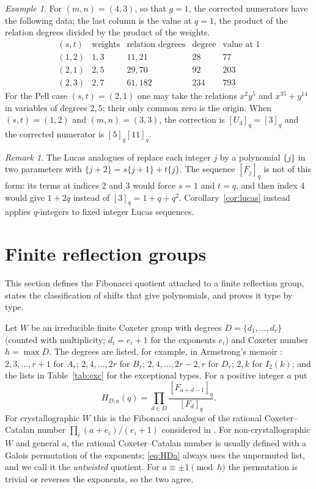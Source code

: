 \documentclass[11pt,a4paper]{article}
\theoremstyle{definition}\newtheorem{definition}[theorem]{Definition}
\theoremstyle{remark}\newtheorem{remark}[theorem]{Remark}\newtheorem{example}[theorem]{Example}
\numberwithin{equation}{section}
\begin{document}
\begin{example}
For $(m,n)=(4,3)$, so that $g=1$, the corrected numerators have the following data; the last column is the value at $q=1$, the product of the relation degrees divided by the product of the weights.
\[
\begin{array}{c|c|c|c|r}
(s,t)&\text{weights}&\text{relation degrees}&\text{degree}&\text{value at }1\\\hline
(1,2)&1,3&11,21&28&77\\
(2,1)&2,5&29,70&92&203\\
(2,3)&2,7&61,182&234&793
\end{array}
\]
For the Pell case $(s,t)=(2,1)$ one may take the relations $x^2y^5$ and $x^{35}+y^{14}$ in variables of degrees $2,5$; their only common zero is the origin. When $(s,t)=(1,2)$ and $(m,n)=(3,3)$, the correction is $[U_3]_q=[3]_q$ and the corrected numerator is $[5]_q[11]_q$.
\end{example}

\begin{remark}\label{rem:lucas-poly}
The Lucas analogues of \cite{bcms,st} replace each integer $j$ by a polynomial $\{j\}$ in two parameters with $\{j+2\}=s\{j+1\}+t\{j\}$. The sequence $[F_j]_q$ is not of this form: its terms at indices $2$ and $3$ would force $s=1$ and $t=q$, and then index $4$ would give $1+2q$ instead of $[3]_q=1+q+q^2$. Corollary~\ref{cor:lucas} instead applies $q$-integers to fixed integer Lucas sequences.
\end{remark}

\section{Finite reflection groups}\label{sec:coxeter}
This section defines the Fibonacci quotient attached to a finite reflection group, states the classification of shifts that give polynomials, and proves it type by type.

Let $W$ be an irreducible finite Coxeter group with degrees $D=\{d_1,\ldots,d_r\}$ (counted with multiplicity; $d_i=e_i+1$ for the exponents $e_i$) and Coxeter number $h=\max D$. The degrees are listed, for example, in Armstrong's memoir \cite[Fig.~2.7]{armstrong}: $2,3,\ldots,r+1$ for $A_r$; $2,4,\ldots,2r$ for $B_r$; $2,4,\ldots,2r-2,r$ for $D_r$; $2,k$ for $I_2(k)$; and the lists in Table~\ref{tab:exc} for the exceptional types. For a positive integer $a$ put
\begin{equation}\label{eq:HDa}
 H_{D,a}(q)=\prod_{d\in D}\frac{[F_{a+d-1}]_q}{[F_d]_q}.
\end{equation}
For crystallographic $W$ this is the Fibonacci analogue of the rational Coxeter--Catalan number $\prod_i(a+e_i)/(e_i+1)$ considered in \cite[Remark~4.5]{bck}. For non-crystallographic $W$ and general $a$, the rational Coxeter--Catalan number is usually defined with a Galois permutation of the exponents; \eqref{eq:HDa} always uses the unpermuted list, and we call it the \emph{untwisted} quotient. For $a\equiv\pm1\pmod h$ the permutation is trivial or reverses the exponents, so the two agree.
\end{document}
